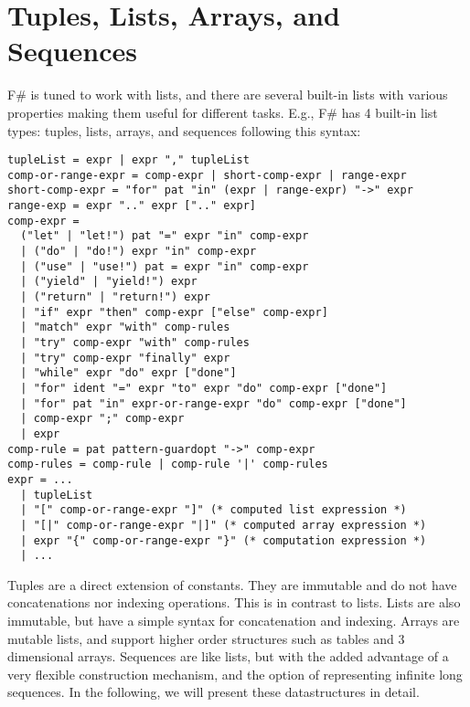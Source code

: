 \chapter{Tuples, Lists, Arrays, and Sequences}
\label{chap:lists}
F\# is tuned to work with lists, and there are several built-in lists with various properties making them useful for different tasks. E.g.,
%
%
F\# has 4 built-in list types: tuples, lists, arrays, and sequences following this syntax:
%
\begin{lstlisting}[language=ebnf]
tupleList = expr | expr "," tupleList
comp-or-range-expr = comp-expr | short-comp-expr | range-expr
short-comp-expr = "for" pat "in" (expr | range-expr) "->" expr
range-exp = expr ".." expr [".." expr]
comp-expr =
  ("let" | "let!") pat "=" expr "in" comp-expr
  | ("do" | "do!") expr "in" comp-expr
  | ("use" | "use!") pat = expr "in" comp-expr
  | ("yield" | "yield!") expr
  | ("return" | "return!") expr
  | "if" expr "then" comp-expr ["else" comp-expr]
  | "match" expr "with" comp-rules
  | "try" comp-expr "with" comp-rules
  | "try" comp-expr "finally" expr
  | "while" expr "do" expr ["done"]
  | "for" ident "=" expr "to" expr "do" comp-expr ["done"]
  | "for" pat "in" expr-or-range-expr "do" comp-expr ["done"]
  | comp-expr ";" comp-expr
  | expr
comp-rule = pat pattern-guardopt "->" comp-expr
comp-rules = comp-rule | comp-rule '|' comp-rules
expr = ... 
  | tupleList
  | "[" comp-or-range-expr "]" (* computed list expression *)
  | "[|" comp-or-range-expr "|]" (* computed array expression *)
  | expr "{" comp-or-range-expr "}" (* computation expression *)
  | ...
\end{lstlisting}
%
Tuples are a direct extension of constants. They are immutable and do not have concatenations nor indexing operations. This is in contrast to lists. Lists are also immutable, but have a simple syntax for concatenation and indexing. Arrays are mutable lists, and support higher order structures such as tables and 3 dimensional arrays. Sequences are like lists, but with the added advantage of a very flexible construction mechanism, and the option of representing infinite long sequences. In the following, we will present these datastructures in detail.


